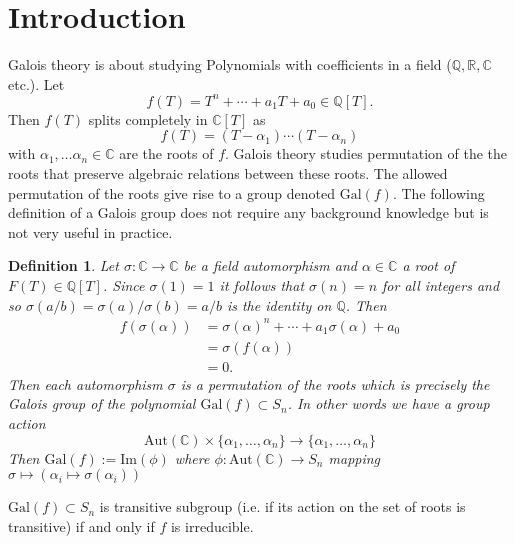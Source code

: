 \documentclass{article}
\theoremstyle{plain}
\newcommand{\R}{\mathbb{R}}
\newcommand{\Cc}{\mathbb{C}}
\newcommand{\Q}{\mathbb{Q}}
\newtheorem*{definition}{Definition}
\theoremstyle{remark}
\begin{document}
    \section{Introduction}
    Galois theory is about studying Polynomials with coefficients in a field ($\Q,\R,\Cc$ etc.).
    Let
    $$
        f(T) = T^n+\cdots+a_1T+a_0\in\Q[T].
    $$
    Then $f(T)$ splits completely in $\Cc[T]$ as
    $$
        f(T)=(T-\alpha_1)\cdots(T-\alpha_n)
    $$
    with $\alpha_1,\dots \alpha_n\in\Cc$ are the roots of $f$. Galois theory studies permutation of the the roots that preserve algebraic relations between these roots.
    The allowed permutation of the roots give rise to a group denoted $\text{Gal}(f)$.
    The following definition of a Galois group does not require any background knowledge but is not very useful in practice.

    \begin{definition}
        Let $\sigma:\Cc\to\Cc$ be a field automorphism and $\alpha\in\Cc$ a root of $F(T)\in\Q[T]$. Since $\sigma(1)=1$ it follows that $\sigma(n)=n$ for all integers and so $\sigma(a/b)=\sigma(a)/\sigma(b)=a/b$ is the identity on $\Q$.
        Then
        \begin{align*}
            f(\sigma(\alpha))&=\sigma(\alpha)^n+\cdots+a_1\sigma(\alpha)+a_0\\
            &=\sigma(f(\alpha))\\
            &=0.
        \end{align*}
        Then each automorphism $\sigma$ is a permutation of the roots which is precisely the Galois group of the polynomial $\text{Gal}(f)\subset S_n$.
        In other words we have a group action 
        $$
        \text{Aut}(\Cc)\times\{\alpha_1,\dots,\alpha_n\}\to\{\alpha_1,\dots,\alpha_n\}
        $$
        Then $\text{Gal}(f):=\text{Im}(\phi)$ where $\phi:\text{Aut}(\Cc)\to S_n$ mapping $\sigma\mapsto(\alpha_i\mapsto \sigma(\alpha_i))$
    \end{definition}

    $\text{Gal}(f)\subset S_n$ is transitive subgroup (i.e. if its action on the set of roots is transitive) if and only if $f$ is irreducible.
    
\end{document}
